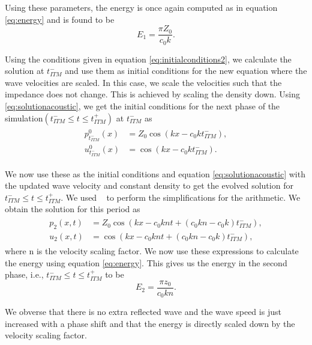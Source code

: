 Using these parameters, the energy is once again computed as in equation \ref{eq:energy} and is found to be
\begin{equation}
    E_1 = \frac{\pi Z_0}{c_0 k} .
\end{equation}

Using the conditions given in equation \ref{eq:initialconditions2}, we calculate the solution at $t_{ITM}^-$ and use them as initial conditions for the new equation where the wave velocities are scaled.
In this case, we scale the velocities such that the impedance does not change. This is achieved by scaling the density down. Using \ref{eq:solutionacoustic}, we get the initial conditions for the next phase of the simulation$\left(t_{ITM}^- \leq t \leq t_{ITM}^+ \right)$ at $t_{ITM}^-$ as
\begin{align}
    \begin{split}
        p^0_{t_{ITM}^-}\left(x\right) &= Z_0 \cos\left(kx - c_0kt_{ITM}^-\right), \\
        u^0_{t_{ITM}^-}\left(x\right) &= \cos\left(kx - c_0kt_{ITM}^-\right) .
    \end{split}
\end{align}

We now use these as the initial conditions and equation \ref{eq:solutionacoustic} with the updated wave velocity and constant density to get the evolved solution for $t_{ITM}^- \leq t \leq t_{ITM}^+ $. 
We used ~\parencite{sagemath} to perform the simplifications for the arithmetic. We obtain the solution for this period as
\begin{align}
    \begin{split}
        p_{2}\left(x, t\right) &= Z_{0} \cos\left(kx -c_{0} k n t + {\left(c_{0} k n - c_{0} k\right)} \mathit{t_{ITM}^-}\right), \\
        u_{2}\left(x, t\right) &= \cos\left(kx -c_{0} k n t + {\left(c_{0} k n - c_{0} k\right)} \mathit{t_{ITM}^-} \right) ,
    \end{split}
\end{align}
where n is the velocity scaling factor. We now use these expressions to calculate the energy using equation \ref{eq:energy}. This gives us the energy in the second phase, i.e., $t_{ITM}^- \leq t \leq t_{ITM}^+ $ to be
\begin{equation}
    E_2 = \frac{\pi z_{0}}{c_{0} k n} .
\end{equation}

We obverse that there is no extra reflected wave and the wave speed is just increased with a phase shift and that the energy is directly scaled down by the velocity scaling factor.

